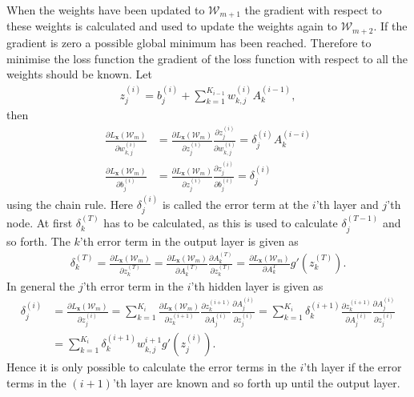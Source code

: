 When the weights have been updated to $\mathcal{W}_{m+1}$ the gradient with respect to these weights is calculated and used to update the weights again to $\mathcal{W}_{m+2}$. If the gradient is zero a possible global minimum has been reached. Therefore to minimise the loss function the gradient of the loss function with respect to all the weights should be known. Let
\begin{align*}
    z^{(i)}_{j} = b_{j}^{(i)} + \sum_{k=1}^{K_{i-1}} w_{k,j}^{(i)}A_k^{(i-1)},
\end{align*}
then 
\begin{align*}
    \frac{\partial L_{\bm{x}}(\mathcal{W}_m)}{\partial w_{k,j}^{(i)}} &= \frac{\partial L_{\bm{x}}(\mathcal{W}_m)}{\partial z^{(i)}_{j}}\frac{\partial z^{(i)}_{j}}{\partial w_{k,j}^{(i)}} = \delta^{(i)}_{j} A_k^{(i-i)}\\
    \frac{\partial L_{\bm{x}}(\mathcal{W}_m)}{\partial b_{j}^{(i)}} &= \frac{\partial L_{\bm{x}}(\mathcal{W}_m)}{\partial z^{(i)}_{j}}\frac{\partial z^{(i)}_{j}}{\partial b_{j}^{(i)}} = \delta^{(i)}_{j}
\end{align*}
using the chain rule. Here $\delta^{(i)}_{j}$ is called the error term at the $i$'th layer and $j$'th node. At first $\delta^{(T)}_k$ has to be calculated, as this is used to calculate $\delta^{(T-1)}_j$ and so forth. The $k$'th error term in the output layer is given as
\begin{align*}
    \delta^{(T)}_{k} =  \frac{\partial L_{\bm{x}}(\mathcal{W}_m)}{\partial z^{(T)}_{k}} = \frac{\partial L_{\bm{x}}(\mathcal{W}_m)}{\partial A_k^{(T)}}\frac{\partial A_k^{(T)}}{\partial z^{(T)}_{k}} = \frac{\partial L_{\bm{x}}(\mathcal{W}_m)}{\partial A_k^{T}} g'(z^{(T)}_{k}).
\end{align*}
In general the $j$'th error term in the $i$'th hidden layer is given as
\begin{align*}
    \delta^{(i)}_{j} &= \frac{\partial L_{\bm{x}}(\mathcal{W}_m)}{\partial z^{(i)}_{j}} = \sum_{k = 1}^{K_{i}} \frac{\partial L_{\bm{x}}(\mathcal{W}_m)}{\partial z^{(i+1)}_{k}} \frac{\partial z^{(i+1)}_{k}}{\partial A^{(i)}_{j}}\frac{\partial A^{(i)}_{j}}{\partial z^{(i)}_{j}} =\sum_{k = 1}^{K_{i}} \delta^{(i+1)}_{k} \frac{\partial z^{(i+1)}_{k}}{\partial A^{(i)}_{j}}\frac{\partial A^{(i)}_{j}}{\partial z^{(i)}_{j}}\\
    &= \sum_{k = 1}^{K_{i}} \delta^{(i+1)}_{k} w_{k,j}^{i+1}g'\left(z_{j}^{(i)}\right).
\end{align*}
Hence it is only possible to calculate the error terms in the $i$'th layer if the error terms in the $(i+1)$'th layer are known and so forth up until the output layer. 

